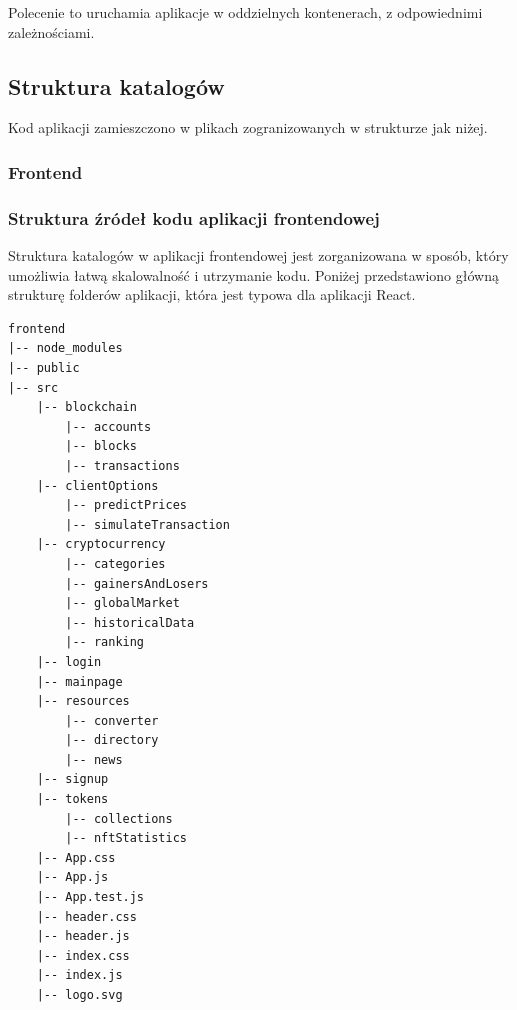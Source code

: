 Polecenie to uruchamia aplikacje w oddzielnych kontenerach, z odpowiednimi zależnościami.

\subsection{Struktura katalogów}
Kod aplikacji zamieszczono w plikach zogranizowanych w strukturze jak niżej.
\subsubsection{Frontend}
\subsubsection{Struktura źródeł kodu aplikacji frontendowej}
Struktura katalogów w aplikacji frontendowej jest zorganizowana w sposób, który umożliwia łatwą skalowalność i utrzymanie kodu. Poniżej przedstawiono główną strukturę folderów aplikacji, która jest typowa dla aplikacji React.
\begin{multicols}{2}
\begin{lstlisting}[basicstyle=\footnotesize\ttfamily]
frontend
|-- node_modules
|-- public
|-- src
    |-- blockchain
        |-- accounts
        |-- blocks
        |-- transactions
    |-- clientOptions
        |-- predictPrices
        |-- simulateTransaction
    |-- cryptocurrency
        |-- categories
        |-- gainersAndLosers
        |-- globalMarket
        |-- historicalData
        |-- ranking
    |-- login
    |-- mainpage
    |-- resources
        |-- converter
        |-- directory
        |-- news
    |-- signup
    |-- tokens
        |-- collections
        |-- nftStatistics
    |-- App.css
    |-- App.js
    |-- App.test.js
    |-- header.css
    |-- header.js
    |-- index.css
    |-- index.js
    |-- logo.svg
\end{lstlisting}
\end{multicols}

